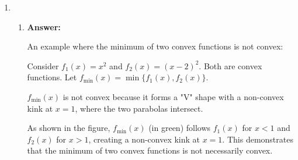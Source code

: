\documentclass{article}
\newenvironment{answer}
    {\par\noindent\textbf{Answer:}\par}
    {\par}
\begin{document}
\begin{enumerate}
\begin{enumerate}
    \item 
    \begin{enumerate}
        \item 
        \begin{answer}
        An example where the minimum of two convex functions is not convex:
        
        Consider $f_1(x) = x^2$ and $f_2(x) = (x-2)^2$. Both are convex functions.
        Let $f_{\min}(x) = \min\{f_1(x), f_2(x)\}$.
        
        $f_{\min}(x)$ is not convex because it forms a "V" shape with a non-convex kink at $x=1$, where the two parabolas intersect.

        \begin{center}
        \end{center}
        
        As shown in the figure, $f_{\min}(x)$ (in green) follows $f_1(x)$ for $x < 1$ and $f_2(x)$ for $x > 1$, creating a non-convex kink at $x=1$. This demonstrates that the minimum of two convex functions is not necessarily convex.
        \end{answer}


\end{enumerate}
\end{enumerate}
\end{enumerate}
\end{document}
